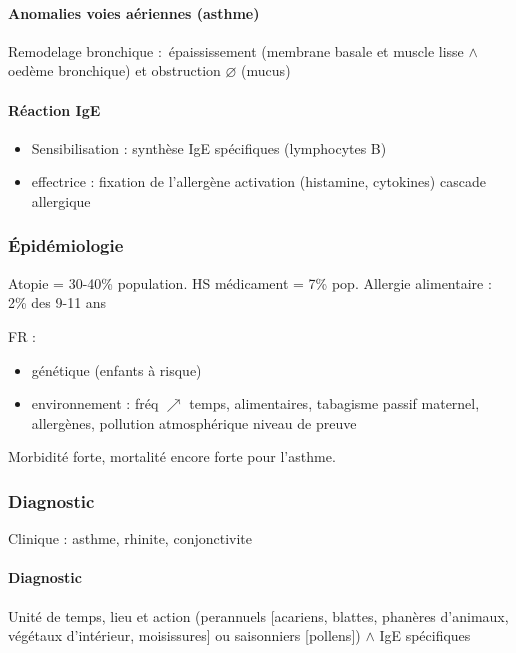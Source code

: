 \documentclass[11pt]{article}
\begin{document}
\paragraph{Anomalies voies aériennes (asthme)}
\label{sec:org79418bb}
Remodelage bronchique : épaississement (membrane basale et muscle lisse \(\wedge\) oedème
bronchique) et obstruction \(\diameter\) (mucus)

\paragraph{Réaction IgE}
\label{sec:org2b3f938}

\begin{itemize}
\item Sensibilisation : synthèse IgE spécifiques (lymphocytes B)
\item effectrice : fixation de l'allergène \thus activation (histamine,
cytokines) \thus cascade allergique
\end{itemize}


\subsubsection{Épidémiologie}
\label{sec:org2101787}
Atopie = 30-40\% population. HS médicament = 7\% pop. Allergie alimentaire : 2\%
des 9-11 ans

FR : 

\begin{itemize}
\item génétique (enfants à risque)
\item environnement : fréq \(\nearrow\) temps, alimentaires, tabagisme passif
maternel, allergènes, pollution atmosphérique \danger niveau de preuve
\end{itemize}

Morbidité forte, mortalité encore forte pour l'asthme.

\subsubsection{Diagnostic}
\label{sec:orge27bed1}
Clinique : asthme, rhinite, conjonctivite

\paragraph{Diagnostic}
\label{sec:orged7db49}
Unité de temps, lieu et action (perannuels [acariens,
blattes, phanères d'animaux, végétaux d'intérieur, moisissures] ou saisonniers
[pollens]) \(\wedge\) IgE spécifiques
\end{document}
